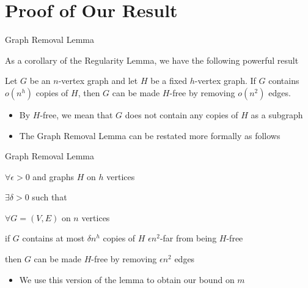 \section{Proof of Our Result}
\begin{frame}{Graph Removal Lemma}

As a corollary of the Regularity Lemma, we have the following powerful result
{
\begin{lemma}
	Let $G$ be an $n$-vertex graph and let $H$ be a fixed $h$-vertex graph. If $G$ contains $o(n^h)$ copies of $H$, then $G$ can be made $H$-free by removing $o(n^2)$ edges.
\end{lemma}
}

\begin{itemize}
	\item By $H$-free, we mean that $G$ does not contain any copies of $H$ as a subgraph
	\item The Graph Removal Lemma can be restated more formally as follows
\end{itemize}

\end{frame}

\begin{frame}{Graph Removal Lemma}

{
\begin{lemma}
	$\forall \epsilon > 0$ and graphs $H$ on $h$ vertices
	\begin{description}[abc]
		\item<2->[$\bullet$] $\exists \delta > 0$ such that
		\begin{description}[abc]
			\item<3->[$\bullet$] $\forall G = (V,E)$ on $n$ vertices
			\begin{description}[abc]
				\item<4->[$\bullet$] if $G$ contains at most $\delta n^h$ copies of $H$ $\epsilon n^2$-far from being $H$-free
				\begin{description}[abc]
					\item<5->[$\bullet$] then $G$ can be made $H$-free by removing $\epsilon n^2$ edges
				\end{description}
			\end{description}
		\end{description}
	\end{description}
\end{lemma}
}

\begin{itemize}
	\item<6-> We use this version of the lemma to obtain our bound on $m$
\end{itemize}

\end{frame}

